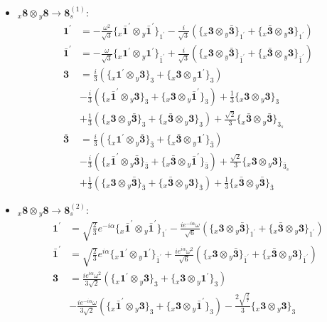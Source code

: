\documentclass[english]{article}
\newcommand{\rep}[1]{\mathbf{#1}}
\newcommand{\repx}[2]{{}_{#2}\mathbf{#1}}
\newcommand{\subcg}[3]{\big\{ \repx{#1}{x}\otimes\repx{#2}{y}\big\}^{}_{#3}}
\begin{document}
\begin{itemize}
\begin{align*}
\end{align*}
\item $\repx{8}{x}\otimes\repx{8}{y}\to\rep{8}_{s}^{(1)}$:
\begin{align*}
\rep{1^{\prime}} & = -\frac{\omega ^2}{\sqrt{3}}\subcg{\bar{1}^{\prime}}{\bar{1}^{\prime}}{1^{\prime}}-\frac{i}{\sqrt{3}}\left(\subcg{3}{\bar{3}}{1^{\prime}}+\subcg{\bar{3}}{3}{1^{\prime}}\right)
\\
\rep{\bar{1}^{\prime}} & = -\frac{\omega }{\sqrt{3}}\subcg{1^{\prime}}{1^{\prime}}{\bar{1}^{\prime}}+\frac{i}{\sqrt{3}}\left(\subcg{3}{\bar{3}}{\bar{1}^{\prime}}+\subcg{\bar{3}}{3}{\bar{1}^{\prime}}\right)
\\
\rep{3} & = \frac{i}{3}\left(\subcg{1^{\prime}}{3}{3}+\subcg{3}{1^{\prime}}{3}\right) \\ 
 & -\frac{i}{3}\left(\subcg{\bar{1}^{\prime}}{3}{3}+\subcg{3}{\bar{1}^{\prime}}{3}\right)+\frac{1}{3}\subcg{3}{3}{3} \\ 
 & +\frac{1}{3}\left(\subcg{3}{\bar{3}}{3}+\subcg{\bar{3}}{3}{3}\right)+\frac{\sqrt{2}}{3}\subcg{\bar{3}}{\bar{3}}{3_{s}}
\\
\rep{\bar{3}} & = \frac{i}{3}\left(\subcg{1^{\prime}}{\bar{3}}{\bar{3}}+\subcg{\bar{3}}{1^{\prime}}{\bar{3}}\right) \\ 
 & -\frac{i}{3}\left(\subcg{\bar{1}^{\prime}}{\bar{3}}{\bar{3}}+\subcg{\bar{3}}{\bar{1}^{\prime}}{\bar{3}}\right)+\frac{\sqrt{2}}{3}\subcg{3}{3}{\bar{3}_{s}} \\ 
 & +\frac{1}{3}\left(\subcg{3}{\bar{3}}{\bar{3}}+\subcg{\bar{3}}{3}{\bar{3}}\right)+\frac{1}{3}\subcg{\bar{3}}{\bar{3}}{\bar{3}}
\end{align*}
\item $\repx{8}{x}\otimes\repx{8}{y}\to\rep{8}_{s}^{(2)}$:
\begin{align*}
\rep{1^{\prime}} & = \sqrt{\frac{2}{3}} e^{-i \alpha }\subcg{\bar{1}^{\prime}}{\bar{1}^{\prime}}{1^{\prime}}-\frac{i e^{-i \alpha } \omega }{\sqrt{6}}\left(\subcg{3}{\bar{3}}{1^{\prime}}+\subcg{\bar{3}}{3}{1^{\prime}}\right)
\\
\rep{\bar{1}^{\prime}} & = \sqrt{\frac{2}{3}} e^{i \alpha }\subcg{1^{\prime}}{1^{\prime}}{\bar{1}^{\prime}}+\frac{i e^{i \alpha } \omega ^2}{\sqrt{6}}\left(\subcg{3}{\bar{3}}{\bar{1}^{\prime}}+\subcg{\bar{3}}{3}{\bar{1}^{\prime}}\right)
\\
\rep{3} & = \frac{i e^{i \alpha } \omega ^2}{3 \sqrt{2}}\left(\subcg{1^{\prime}}{3}{3}+\subcg{3}{1^{\prime}}{3}\right) \\ 
 & -\frac{i e^{-i \alpha } \omega }{3 \sqrt{2}}\left(\subcg{\bar{1}^{\prime}}{3}{3}+\subcg{3}{\bar{1}^{\prime}}{3}\right)-\frac{2 \sqrt{\frac{2}{7}}}{3}\subcg{3}{3}{3} \\ 

\end{align*}
\end{itemize}
\end{document}
